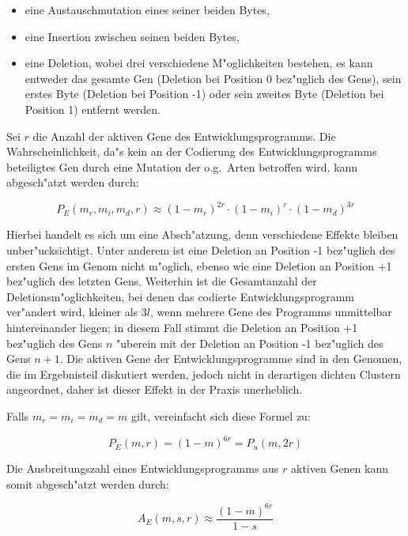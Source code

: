 \begin{itemize}
\item eine Austauschmutation eines seiner beiden Bytes,
\item eine Insertion zwischen seinen beiden Bytes,
\item eine Deletion, wobei drei verschiedene M"oglichkeiten bestehen, es kann entweder
das gesamte Gen (Deletion bei Position 0 bez"uglich des Gens), sein erstes Byte
(Deletion bei Position -1) oder sein zweites Byte (Deletion bei Position 1) entfernt
werden.
\end{itemize}

Sei $r$ die Anzahl der aktiven Gene des Entwicklungsprogramms.
Die Wahrscheinlichkeit, da"s kein an der Codierung des Entwicklungsprogramms beteiligtes Gen
durch eine Mutation der o.g.\ Arten betroffen wird, kann abgesch"atzt werden durch:

\begin{equation}
\label{prgunchanged-eq}
P_E(m_r, m_i, m_d, r) \approx (1-m_r)^{2r} \cdot (1-m_i)^{r} \cdot (1-m_d)^{3r}
\end{equation}

Hierbei handelt es sich um eine Absch"atzung, denn verschiedene Effekte bleiben unber"ucksichtigt.
Unter anderem ist eine Deletion an Position -1 bez"uglich des ersten Gens im Genom nicht
m"oglich, ebenso wie eine Deletion an Position +1 bez"uglich des letzten Gens. Weiterhin
ist die Gesamtanzahl der Deletionsm"oglichkeiten, bei denen das codierte Entwicklungsprogramm
ver"andert wird, kleiner als $3l$, wenn mehrere Gene des Programms unmittelbar hintereinander
liegen; in diesem Fall stimmt die Deletion an Position +1 bez"uglich des Gens $n$ "uberein
mit der Deletion an Position -1 bez"uglich des Gens $n+1$. Die aktiven Gene der Entwicklungsprogramme
sind in den Genomen, die im Ergebnisteil diskutiert werden, jedoch nicht in derartigen dichten
Clustern angeordnet, daher ist dieser Effekt in der Praxis unerheblich.

Falls $m_r = m_i = m_d = m$ gilt, vereinfacht sich diese Formel zu:

\begin{equation}
\label{prgunchangedm-eq}
P_E(m, r) = (1-m)^{6r} = P_u(m, 2r)
\end{equation}

Die Ausbreitungszahl eines Entwicklungsprogramms aus $r$ aktiven Genen kann somit abgesch"atzt werden durch:

\begin{equation}
\label{programspreadm-eq}
A_E(m, s, r) \approx \frac{(1-m)^{6r}}{1-s}
\end{equation}

